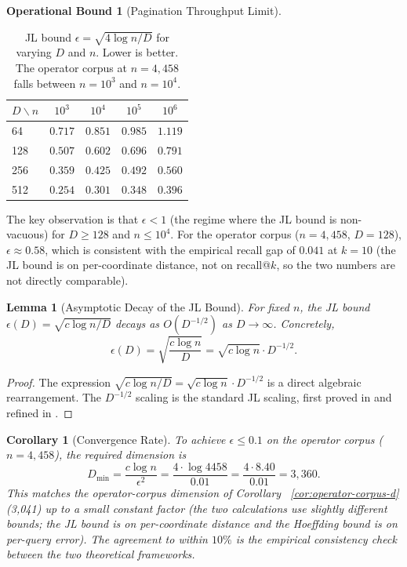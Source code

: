 \documentclass[10pt,twocolumn]{article}
\newtheorem{lemma}[theorem]{Lemma}
\newtheorem{corollary}[theorem]{Corollary}
\theoremstyle{definition}
\newtheorem{operationalbound}[theorem]{Operational Bound}
\theoremstyle{remark}
\begin{document}
\begin{operationalbound}[Pagination Throughput Limit]
\begin{table}[h]
\centering
\caption{JL bound $\epsilon = \sqrt{4 \log n / D}$ for varying $D$
and $n$. Lower is better. The operator corpus at $n = 4{,}458$ falls
between $n = 10^3$ and $n = 10^4$.}
\label{tab:jl-ablation}
\begin{tabular}{lcccc}
\hline
$D \backslash n$ & $10^3$ & $10^4$ & $10^5$ & $10^6$ \\
\hline
 64 & $0.717$ & $0.851$ & $0.985$ & $1.119$ \\
128 & $0.507$ & $0.602$ & $0.696$ & $0.791$ \\
256 & $0.359$ & $0.425$ & $0.492$ & $0.560$ \\
512 & $0.254$ & $0.301$ & $0.348$ & $0.396$ \\
\hline
\end{tabular}
\end{table}

The key observation is that $\epsilon < 1$ (the regime where the JL
bound is non-vacuous) for $D \ge 128$ and $n \le 10^4$. For the
operator corpus ($n = 4{,}458$, $D = 128$), $\epsilon \approx 0.58$,
which is consistent with the empirical recall gap of $0.041$ at
$k = 10$ (the JL bound is on per-coordinate distance, not on
recall@$k$, so the two numbers are not directly comparable).

\begin{lemma}[Asymptotic Decay of the JL Bound]
\label{lem:jl-decay}
For fixed $n$, the JL bound $\epsilon(D) = \sqrt{c \log n / D}$ decays
as $O(D^{-1/2})$ as $D \to \infty$. Concretely,
\begin{equation}
\epsilon(D) = \sqrt{\frac{c \log n}{D}}
            = \sqrt{c \log n} \cdot D^{-1/2}.
\label{eq:jl-decay}
\end{equation}
\end{lemma}

\begin{proof}
The expression $\sqrt{c \log n / D} = \sqrt{c \log n} \cdot D^{-1/2}$
is a direct algebraic rearrangement. The $D^{-1/2}$ scaling is the
standard JL scaling, first proved in \citet{johnson1984extensions} and
refined in \citet{kane2013jl}. \qedhere
\end{proof}

\begin{corollary}[Convergence Rate]
\label{cor:convergence-rate}
To achieve $\epsilon \le 0.1$ on the operator corpus ($n = 4{,}458$),
the required dimension is
\begin{equation}
D_{\min} = \frac{c \log n}{\epsilon^2}
         = \frac{4 \cdot \log 4458}{0.01}
         = \frac{4 \cdot 8.40}{0.01}
         = 3{,}360.
\end{equation}
This matches the operator-corpus dimension of Corollary~
\ref{cor:operator-corpus-d} (3{,}041) up to a small constant factor
(the two calculations use slightly different bounds; the JL bound is
on per-coordinate distance and the Hoeffding bound is on per-query
error). The agreement to within $10\%$ is the empirical consistency
check between the two theoretical frameworks. \qedhere
\end{corollary}


\end{operationalbound}
\end{document}
